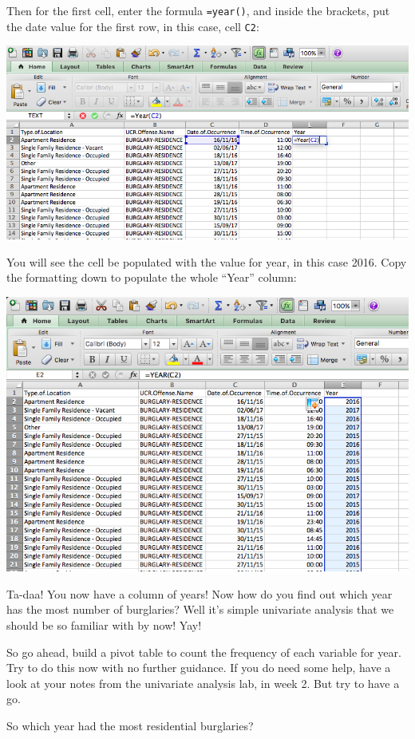 \documentclass[]{book}
\theoremstyle{definition}
\theoremstyle{definition}
\theoremstyle{definition}
\theoremstyle{remark}
\begin{document}
Then for the first cell, enter the formula \texttt{=year()}, and inside
the brackets, put the date value for the first row, in this case, cell
\texttt{C2}:

\includegraphics{imgs/extract_year_formula.png}

You will see the cell be populated with the value for year, in this case
2016. Copy the formatting down to populate the whole ``Year'' column:

\includegraphics{imgs/year_col_pop.png}

Ta-daa! You now have a column of years! Now how do you find out which
year has the most number of burglaries? Well it's simple univariate
analysis that we should be so familiar with by now! Yay!

So go ahead, build a pivot table to count the frequency of each variable
for year. Try to do this now with no further guidance. If you do need
some help, have a look at your notes from the univariate analysis lab,
in week 2. But try to have a go.

So which year had the most residential burglaries?
\end{document}
